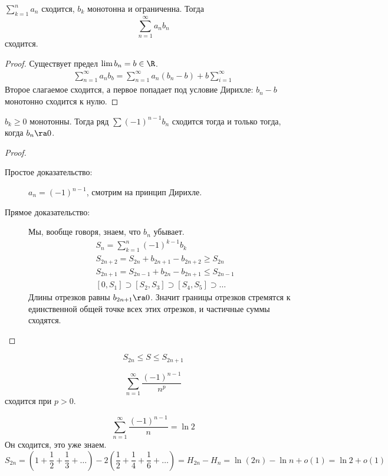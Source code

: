 \begin{theorem}
	$\sum_{k=1}^n a_n$ сходится, $b_k$ монотонна и ограниченна.
	Тогда
	\[ \sum_{n=1}^\infty a_n b_n \]
	сходится.
\end{theorem}

\begin{proof}
	Существует предел $\lim b_n = b \in \R$.
	\begin{gather*}
		\sum_{n=1}^\infty a_n b_b = \sum_{n=1}^\infty a_n (b_n - b) + b \sum_{i=1}^\infty
	\end{gather*}
	Второе слагаемое сходится, а первое попадает под условие Дирихле: $b_n - b$ монотонно сходится к нулю.
\end{proof}

\begin{theorem}
	$b_k \ge 0$ монотонны.
	Тогда ряд $\sum (-1)^{n-1} b_n$ сходится тогда и только тогда, когда $b_n \ra 0$.
\end{theorem}
\begin{proof}
	\begin{description}
	\item[Простое доказательство:]
		$a_n = (-1)^{n-1}$, смотрим на принцип Дирихле.

	\item[Прямое доказательство:]
		Мы, вообще говоря, знаем, что $b_n$ убывает.
		\begin{gather*}
			S_n = \sum_{k=1}^n (-1)^{k-1} b_k \\
			S_{2n+2} = S_{2n} + b_{2n+1} - b_{2n+2} \ge S_{2n} \\
			S_{2n+1} = S_{2n-1} + b_{2n} - b_{2n+1} \le S_{2n-1} \\
			[0, S_1] \supset [S_2, S_3] \supset [S_4, S_5] \supset \dots
		\end{gather*}
		Длины отрезков равны $b_{2n+1} \ra 0$.
		Значит границы отрезков стремятся к единственной общей точке всех этих отрезков, и частичные суммы сходятся.
	\end{description}
\end{proof}
\begin{Rem}
	\[ S_{2n} \le S \le S_{2n+1} \]
\end{Rem}

\begin{exmp}
	\[ \sum_{n=1}^\infty \frac{(-1)^{n-1}}{n^p} \]
	сходится при $p > 0$.
\end{exmp}

\begin{exmp}
	\[ \sum_{n=1}^\infty \frac{(-1)^{n-1}}n = \ln 2 \]
	Он сходится, это уже знаем.
	\[
		S_{2n}
		= \left(1 + \frac12 + \frac13 + \dots\right) - 2\left(\frac12 + \frac14 + \frac16 + \dots\right)
		= H_{2n} - H_n
		= \ln(2n) - \ln n + o(1)
		= \ln 2 + o(1)
	\]
\end{exmp}

